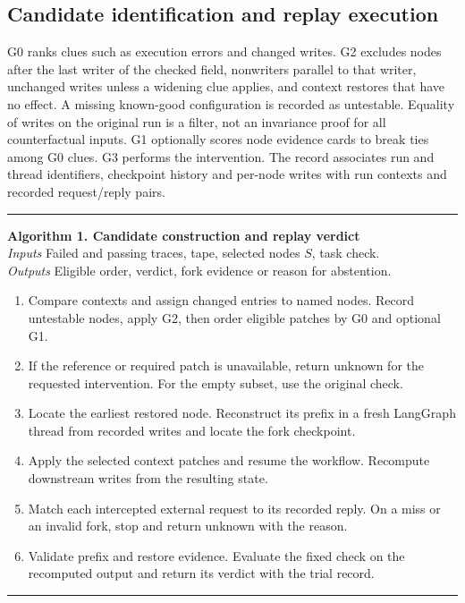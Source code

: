 \documentclass[11pt,letterpaper]{article}
\begin{document}
\subsection{Candidate identification and replay execution}
G0 ranks clues such as execution errors and changed writes. G2 excludes nodes after the last writer of the checked field, nonwriters parallel to that writer, unchanged writes unless a widening clue applies, and context restores that have no effect. A missing known-good configuration is recorded as untestable. Equality of writes on the original run is a filter, not an invariance proof for all counterfactual inputs. G1 optionally scores node evidence cards to break ties among G0 clues. G3 performs the intervention. The record associates run and thread identifiers, checkpoint history and per-node writes with run contexts and recorded request/reply pairs.

\begin{center}\begin{minipage}{.96\linewidth}\hrule\smallskip
\textbf{Algorithm 1. Candidate construction and replay verdict}\\
\textit{Inputs} Failed and passing traces, tape, selected nodes $S$, task check.\\
\textit{Outputs} Eligible order, verdict, fork evidence or reason for abstention.
\begin{enumerate}\setlength{\itemsep}{0pt}
\item Compare contexts and assign changed entries to named nodes. Record untestable nodes, apply G2, then order eligible patches by G0 and optional G1.
\item If the reference or required patch is unavailable, return unknown for the requested intervention. For the empty subset, use the original check.
\item Locate the earliest restored node. Reconstruct its prefix in a fresh LangGraph thread from recorded writes and locate the fork checkpoint.
\item Apply the selected context patches and resume the workflow. Recompute downstream writes from the resulting state.
\item Match each intercepted external request to its recorded reply. On a miss or an invalid fork, stop and return unknown with the reason.
\item Validate prefix and restore evidence. Evaluate the fixed check on the recomputed output and return its verdict with the trial record.
\end{enumerate}\hrule\end{minipage}\end{center}
\end{document}
